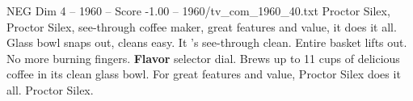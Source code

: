 \begin{textsample}{NEG Dim 4 – 1960 – Score -1.00 – 1960/tv\_com\_1960\_40.txt}  \label{ex:f4_neg_090}
Proctor Silex, Proctor Silex, see-through coffee maker, great features and value, it does it all.
Glass bowl snaps out, cleans easy.
It 's see-through clean.
Entire basket lifts out.
No more burning fingers. \textbf{Flavor} selector dial.
Brews up to 11 cups of delicious coffee in its clean glass bowl.
For great features and value, Proctor Silex does it all.
Proctor Silex.

\end{textsample}
